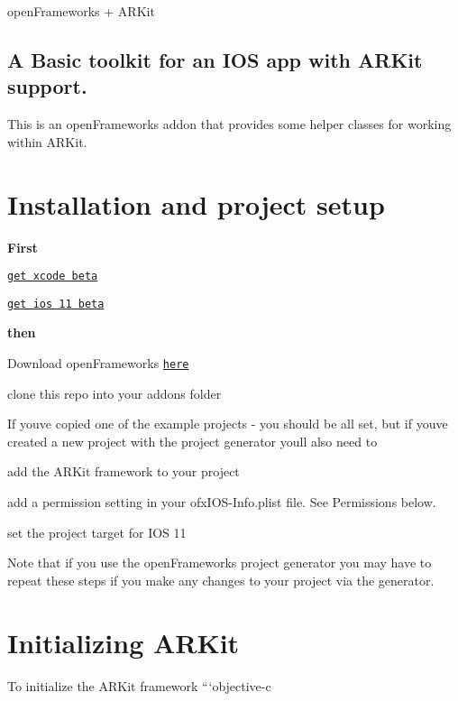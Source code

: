 open\+Frameworks + A\+R\+Kit

\subsection*{A Basic toolkit for an I\+OS app with A\+R\+Kit support.}

This is an open\+Frameworks addon that provides some helper classes for working within A\+R\+Kit.

\section*{Installation and project setup}

{\bfseries First}
\begin{DoxyItemize}
\item \href{https://developer.apple.com/download/}{\tt get xcode beta}
\item \href{https://beta.apple.com/sp/betaprogram/guide}{\tt get ios 11 beta}
\end{DoxyItemize}

{\bfseries then}
\begin{DoxyItemize}
\item Download open\+Frameworks \href{http://openframeworks.cc/versions/v0.9.8/of_v0.9.8_ios_release.zip}{\tt here}
\item clone this repo into your addons folder
\end{DoxyItemize}

If you\textquotesingle{}ve copied one of the example projects -\/ you should be all set, but if you\textquotesingle{}ve created a new project with the project generator you\textquotesingle{}ll also need to


\begin{DoxyItemize}
\item add the A\+R\+Kit framework to your project
\end{DoxyItemize}




\begin{DoxyItemize}
\item add a permission setting in your {\ttfamily ofx\+I\+O\+S-\/\+Info.\+plist} file. See Permissions below.
\item set the project target for I\+OS 11 
\end{DoxyItemize}

Note that if you use the open\+Frameworks project generator you may have to repeat these steps if you make any changes to your project via the generator.

\section*{Initializing A\+R\+Kit}

To initialize the A\+R\+Kit framework ```objective-\/c 